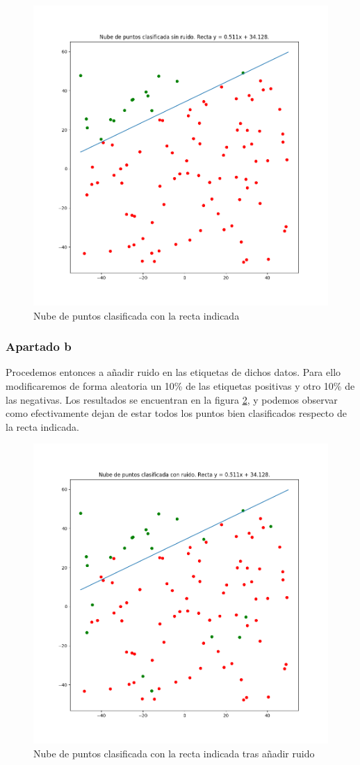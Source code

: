 \documentclass[
  a4paper,
  spanish,
  12pt,
  enlargefirstpage,
]{scrartcl}
\begin{document}
\begin{figure}[h]
    \centering
    \includegraphics[width=0.6\linewidth]{img/Labes.png}
    \caption{Nube de puntos clasificada con la recta indicada}%
    \label{fig:img/Labes}
\end{figure}

\subsubsection*{Apartado b}%
\label{sub:apartado_b}

Procedemos entonces a añadir ruido en las etiquetas de dichos datos. Para ello modificaremos de forma aleatoria un 10\% de las etiquetas positivas y otro 10\% de las negativas. Los resultados se encuentran en la figura \ref{fig:img/LabelsNoise}, y podemos observar como efectivamente dejan de estar todos los puntos bien clasificados respecto de la recta indicada.

\begin{figure}[h]
    \centering
    \includegraphics[width=0.6\linewidth]{img/LabelsNoise.png}
    \caption{Nube de puntos clasificada con la recta indicada tras añadir ruido}%
    \label{fig:img/LabelsNoise}
\end{figure}
\end{document}
